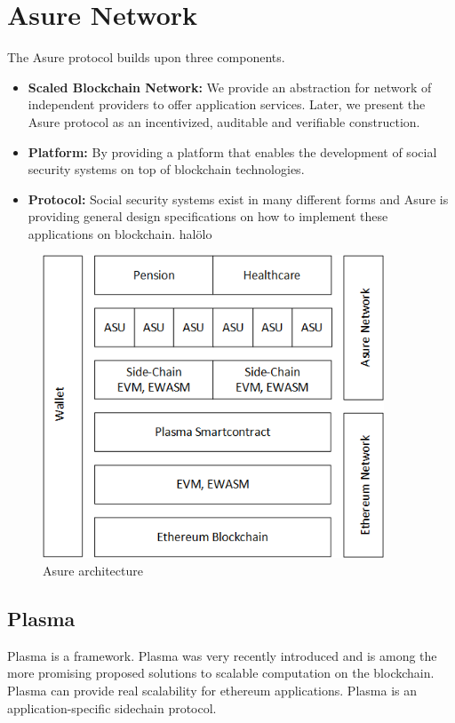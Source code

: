 \section{Asure Network}

The Asure protocol builds upon three components.

\begin{itemize}
\item \textbf{Scaled Blockchain Network:} We provide an abstraction for network of independent providers to offer application services. Later, we present the Asure protocol as an incentivized, auditable and verifiable construction.
\item \textbf{Platform:} By providing a platform that enables the development of social security systems on top of blockchain technologies.
\item \textbf{Protocol:} Social security systems exist in many different forms and Asure is providing general design specifications on how to implement these applications on blockchain.
halölo

\end{itemize}

\begin{figure}
    \centering
    \includegraphics[width=4.0in]{architecture.png}
    \caption{Asure architecture}
    \label{fig:asure_architecture}
\end{figure}

\subsection{Plasma}

Plasma is a framework. Plasma was very recently introduced and is among the more promising proposed solutions to scalable computation on the blockchain. Plasma can provide real scalability for ethereum applications. 
\newline
Plasma is an application-specific sidechain protocol.

